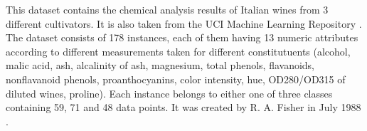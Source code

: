 \marginnote{\textcolor{blue}{Jonas Elpelt}}
This dataset contains the chemical analysis results of Italian wines from 3 different cultivators. It is also taken from the UCI Machine Learning Repository \cite{Dua2019}. 
The dataset consists of 178 instances, each of them having 13 numeric attributes according to different measurements taken for different constitutuents (alcohol, malic acid, ash, alcalinity of ash, magnesium, total phenols, flavanoids, nonflavanoid phenols, proanthocyanins, color intensity, hue, OD280/OD315 of diluted wines, proline). Each instance belongs to either one of three classes containing 59, 71 and 48 data points. 
It was created by R. A. Fisher in July 1988 \cite{scikitlearn}. 
